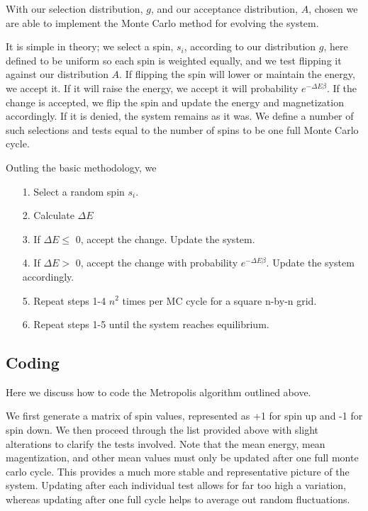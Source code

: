 \documentclass[11pt,a4paper]{article}
\begin{document}
With our selection distribution, $g$, and our acceptance distribution, $A$, chosen we are able to implement the Monte Carlo method for evolving the system. 

It is simple in theory; we select a spin, $s_i$, according to our distribution $g$, here defined to be uniform so each spin is weighted equally, and we test flipping it against our distribution $A$. If flipping the spin will lower or maintain the energy, we accept it. If it will raise the energy, we accept it will probability $e^{-\Delta E\beta}$. If the change is accepted, we flip the spin and update the energy and magnetization accordingly. If it is denied, the system remains as it was. We define a number of such selections and tests equal to the number of spins to be one full Monte Carlo cycle.

Outling the basic methodology, we
\begin{enumerate}
\item[1.]
Select a random spin $s_i$.
\item[2.]
Calculate $\Delta E$
\item[3.]
If $\Delta E \leq$ 0, accept the change. Update the system.
\item[4.]
If $\Delta E >$ 0, accept the change with probability $e^{-\Delta E\beta}$. Update the system accordingly.
\item[5.]
Repeat steps 1-4 $n^2$ times per MC cycle for a square n-by-n grid.
\item[6.]
Repeat steps 1-5 until the system reaches equilibrium.
\end{enumerate}

\subsection{Coding}

Here we discuss how to code the Metropolis algorithm outlined above.

We first generate a matrix of spin values, represented as +1 for spin up and -1 for spin down. We then proceed through the list provided above with slight alterations to clarify the tests involved. Note that the mean energy, mean magentization, and other mean values must only be updated after one full monte carlo cycle. This provides a much more stable and representative picture of the system. Updating after each individual test allows for far too high a variation, whereas updating after one full cycle helps to average out random fluctuations.
\end{document}
